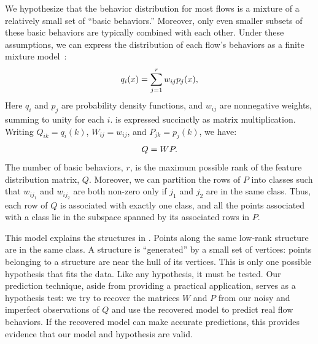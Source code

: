 \documentclass{acm_proc_article-sp}
\begin{document}
We hypothesize that the behavior distribution for most flows is a mixture of a relatively small set of ``basic behaviors.''
Moreover, only even smaller subsets of these basic behaviors are typically combined with each other.
Under these assumptions, we can express the distribution of each flow's behaviors as a finite mixture model~\cite{McLachlan00}:
\begin{align}\eqn{mixture-model}
  q_i(x) = \sum_{j=1}^r w_{ij} p_j(x),
\end{align}
Here $q_i$ and $p_j$ are probability density functions, and $w_{ij}$ are nonnegative weights, summing to unity for each $i$.
 is expressed succinctly as matrix multiplication.
Writing $Q_{ik} = q_i(k)$, $W_{ij} = w_{ij}$, and $P_{jk} = p_j(k)$, we have:
\begin{align}\eqn{mixture-model-matrix}
  Q = WP.
\end{align}
The number of basic behaviors, $r$, is the maximum possible rank of the feature distribution matrix, $Q$.
Moreover, we can partition the rows of $P$ into classes such that $w_{ij_1}$ and $w_{ij_2}$ are both non-zero only if $j_1$ and $j_2$ are in the same class.
Thus, each row of $Q$ is associated with exactly one class, and all the points associated with a class lie in the subspace spanned by its associated rows in $P$.

This model explains the structures in .
Points along the same low-rank structure are in the same class.
A structure is ``generated'' by a small set of vertices:
points belonging to a structure are near the hull of its vertices.
This is only one possible hypothesis that fits the data.
Like any hypothesis, it must be tested.
Our prediction technique, aside from providing a practical application, serves as a hypothesis test:
we try to recover the matrices $W$ and $P$ from our noisy and imperfect observations of $Q$ and use the recovered model to predict real flow behaviors.
If the recovered model can make accurate predictions, this provides evidence that our model and hypothesis are valid.

\end{document}
